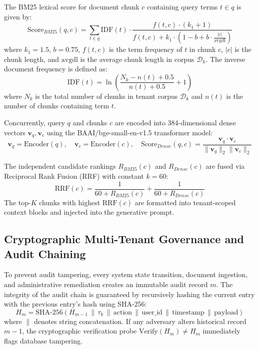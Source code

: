 \documentclass[12pt,onecolumn,draftclsnofoot]{IEEEtran}
\begin{document}
The BM25 lexical score for document chunk $c$ containing query terms $t \in q$ is given by:
\begin{equation}
\text{Score}_{BM25}(q, c) = \sum_{t \in q} \text{IDF}(t) \cdot \frac{f(t, c) \cdot (k_1 + 1)}{f(t, c) + k_1 \cdot \left(1 - b + b \cdot \frac{|c|}{\text{avgdl}}\right)}
\end{equation}
where $k_1 = 1.5$, $b = 0.75$, $f(t, c)$ is the term frequency of $t$ in chunk $c$, $|c|$ is the chunk length, and $\text{avgdl}$ is the average chunk length in corpus $\mathcal{D}_k$. The inverse document frequency is defined as:
\begin{equation}
\text{IDF}(t) = \ln \left( \frac{N_k - n(t) + 0.5}{n(t) + 0.5} + 1 \right)
\end{equation}
where $N_k$ is the total number of chunks in tenant corpus $\mathcal{D}_k$ and $n(t)$ is the number of chunks containing term $t$.

Concurrently, query $q$ and chunks $c$ are encoded into 384-dimensional dense vectors $\mathbf{v}_q, \mathbf{v}_c$ using the BAAI/bge-small-en-v1.5 transformer model:
\begin{equation}
\mathbf{v}_q = \text{Encoder}(q), \quad \mathbf{v}_c = \text{Encoder}(c), \quad \text{Score}_{Dense}(q, c) = \frac{\mathbf{v}_q \cdot \mathbf{v}_c}{\|\mathbf{v}_q\|_2 \|\mathbf{v}_c\|_2}
\end{equation}

The independent candidate rankings $R_{BM25}(c)$ and $R_{Dense}(c)$ are fused via Reciprocal Rank Fusion (RRF) with constant $k = 60$:
\begin{equation}
\text{RRF}(c) = \frac{1}{60 + R_{BM25}(c)} + \frac{1}{60 + R_{Dense}(c)}
\end{equation}
The top-$K$ chunks with highest $\text{RRF}(c)$ are formatted into tenant-scoped context blocks and injected into the generative prompt.

\subsection{Cryptographic Multi-Tenant Governance and Audit Chaining}
To prevent audit tampering, every system state transition, document ingestion, and administrative remediation creates an immutable audit record $m$. The integrity of the audit chain is guaranteed by recursively hashing the current entry with the previous entry's hash using SHA-256:
\begin{equation}
H_m = \text{SHA-256}\left( H_{m-1} \,\|\, \tau_k \,\|\, \text{action} \,\|\, \text{user\_id} \,\|\, \text{timestamp} \,\|\, \text{payload} \right)
\end{equation}
where $\|$ denotes string concatenation. If any adversary alters historical record $m-1$, the cryptographic verification probe $\text{Verify}(H_m) \neq H_m$ immediately flags database tampering.
\end{document}
